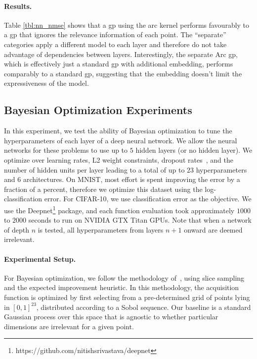 \documentclass{article}
\newcommand{\gp}{{\sc gp}}
\begin{document}
\paragraph{Results.}
Table \ref{tbl:nn_nmse} shows that a \gp{} using the arc kernel performs favourably to a \gp{} that ignores the relevance information of each point.
The ``separate'' categories apply a different model to each layer and therefore do not take advantage of dependencies between layers.
Interestingly, the separate Arc \gp{}, which is effectively just a standard \gp{} with additional embedding, performs comparably to a standard \gp{}, suggesting that the embedding doesn't limit the expressiveness of the model.

\subsection{Bayesian Optimization Experiments}  
\vspace{-0.05in} 
In this experiment, we test the ability of Bayesian optimization to tune the hyperparameters of each layer of a deep neural network.
We allow the neural networks for these problems to use up to $5$ hidden layers (or no hidden layer).
We optimize over learning rates, L2 weight constraints, dropout rates~\cite{hinton2012improving}, and the number of hidden units per layer leading to a total of up to $23$ hyperparameters and $6$ architectures.
On MNIST, most effort is spent improving the error by a fraction of a percent, therefore we optimize this dataset using the log-classification error. For CIFAR-10, we use classification error as the objective.
We use the Deepnet\footnote{https://github.com/nitishsrivastava/deepnet} package, and each function evaluation took approximately $1000$ to $2000$ seconds to run on NVIDIA GTX Titan GPUs.
Note that when a network of depth $n$ is tested, all hyperparameters from layers $n+1$ onward are deemed irrelevant.
\paragraph{Experimental Setup.}
For Bayesian optimization, we follow the methodology of~\cite{snoek-etal-2012b}, using slice sampling and the expected improvement heuristic.
In this methodology, the acquisition function is optimized by first selecting from a pre-determined grid of points lying in $[0,1]^{23}$, distributed according to a Sobol sequence.
Our baseline is a standard Gaussian process over this space that is agnostic to whether particular dimensions are irrelevant for a given point.
\end{document}
